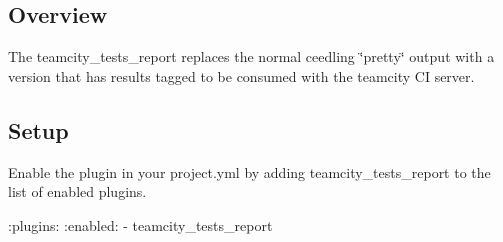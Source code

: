 \subsection*{Overview}

The teamcity\+\_\+tests\+\_\+report replaces the normal ceedling \char`\"{}pretty\char`\"{} output with a version that has results tagged to be consumed with the teamcity CI server.

\subsection*{Setup}

Enable the plugin in your project.\+yml by adding {\ttfamily teamcity\+\_\+tests\+\_\+report} to the list of enabled plugins.


\begin{DoxyCode}
:plugins:
  :enabled:
    - teamcity\_tests\_report
\end{DoxyCode}
 